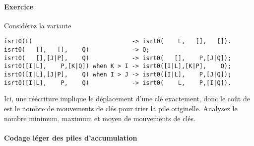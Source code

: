 \paragraph{Exercice}

Considérez la variante
{\small
\begin{verbatim}
isrt0(L)                            -> isrt0(    L,   [],   []).
isrt0(   [],   [],    Q)            -> Q;
isrt0(   [],[J|P],    Q)            -> isrt0(   [],    P,[J|Q]);
isrt0([I|L],    P,[K|Q]) when K > I -> isrt0([I|L],[K|P],    Q);
isrt0([I|L],[J|P],    Q) when I > J -> isrt0([I|L],    P,[J|Q]);
isrt0([I|L],    P,    Q)            -> isrt0(    L,    P,[I|Q]).
\end{verbatim}
}
\noindent Ici, une réécriture implique le déplacement d'une clé
exactement, donc le coût de  est le nombre de
mouvements de clés pour trier la pile originelle. Analysez le nombre
minimum, maximum et moyen de mouvements de clés.

\paragraph{Codage léger des piles d'accumulation}

